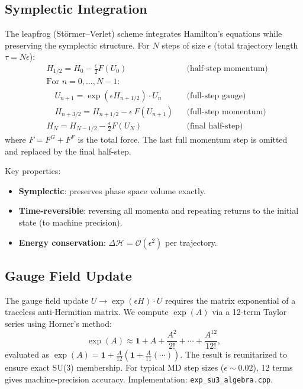 \documentclass[12pt]{article}
\newcommand{\code}[1]{\texttt{#1}}
\begin{document}
\subsection{Symplectic Integration}

The leapfrog (St\"ormer--Verlet) scheme integrates Hamilton's equations while preserving the symplectic structure. For $N$ steps of size $\epsilon$ (total trajectory length $\tau = N\epsilon$):
\begin{align}
\label{eq:leapfrog}
&H_{1/2} = H_0 - \frac{\epsilon}{2} F(U_0) & &\text{(half-step momentum)} \nonumber \\
&\text{For } n = 0, \ldots, N-1: \nonumber \\
&\quad U_{n+1} = \exp(\epsilon H_{n+1/2}) \cdot U_n & &\text{(full-step gauge)} \nonumber \\
&\quad H_{n+3/2} = H_{n+1/2} - \epsilon \, F(U_{n+1}) & &\text{(full-step momentum)} \nonumber \\
&H_N = H_{N-1/2} - \frac{\epsilon}{2} F(U_N) & &\text{(final half-step)}
\end{align}
where $F = F^G + F^F$ is the total force. The last full momentum step is omitted and replaced by the final half-step.

Key properties:
\begin{itemize}
\item \textbf{Symplectic}: preserves phase space volume exactly.
\item \textbf{Time-reversible}: reversing all momenta and repeating returns to the initial state (to machine precision).
\item \textbf{Energy conservation}: $\Delta\mathcal{H} = \mathcal{O}(\epsilon^2)$ per trajectory.
\end{itemize}

\subsection{Gauge Field Update}

The gauge field update $U \to \exp(\epsilon H) \cdot U$ requires the matrix exponential of a traceless anti-Hermitian matrix. We compute $\exp(A)$ via a 12-term Taylor series using Horner's method:
\begin{equation}
\exp(A) \approx \mathbf{1} + A + \frac{A^2}{2!} + \cdots + \frac{A^{12}}{12!},
\end{equation}
evaluated as $\exp(A) = \mathbf{1} + \frac{A}{12}(\mathbf{1} + \frac{A}{11}(\cdots))$. The result is reunitarized to ensure exact SU(3) membership. For typical MD step sizes ($\epsilon \sim 0.02$), 12 terms gives machine-precision accuracy. Implementation: \code{exp\_su3\_algebra.cpp}.
\end{document}
